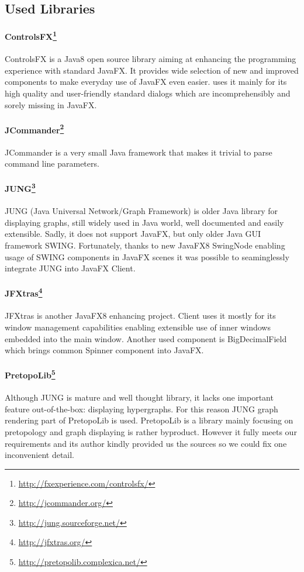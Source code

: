 \subsection{Used Libraries}


\paragraph{ControlsFX\footnote{\url{http://fxexperience.com/controlsfx/}}}
ControlsFX is a Java8 open source library aiming at enhancing the programming
experience with standard JavaFX. It provides wide selection of new and improved
components to make everyday use of JavaFX even easier. \textan{} uses it mainly
for its high quality and user-friendly standard dialogs which are
incomprehensibly and sorely missing in JavaFX.

\paragraph{JCommander\footnote{\url{http://jcommander.org/}}}
JCommander is a very small Java framework that makes it trivial to parse command
line parameters.

\paragraph{JUNG\footnote{\url{http://jung.sourceforge.net/}}}
JUNG (Java Universal Network/Graph Framework) is older Java library for
displaying graphs, still widely used in Java world, well documented and easily
extensible. Sadly, it does not support JavaFX, but only older Java GUI framework
SWING. Fortunately, thanks to new JavaFX8 SwingNode enabling usage of SWING
components in JavaFX scenes it was possible to seaminglessly integrate JUNG into
JavaFX \textan{} Client.

\paragraph{JFXtras\footnote{\url{http://jfxtras.org/}}}
JFXtras is another JavaFX8 enhancing project. \textan{} Client uses it mostly
for its window management capabilities enabling extensible use of inner windows
embedded into the main window. Another used component is BigDecimalField which
brings common Spinner component into JavaFX.

\paragraph{PretopoLib\footnote{\url{http://pretopolib.complexica.net/}}}
Although JUNG is mature and well thought library, it lacks one important feature
out-of-the-box: displaying hypergraphs. For this reason JUNG graph rendering
part of PretopoLib is used. PretopoLib is a library mainly focusing on
pretopology and graph displaying is rather byproduct. However it fully meets our
requirements and its author kindly provided us the sources so we could fix one
inconvenient detail.